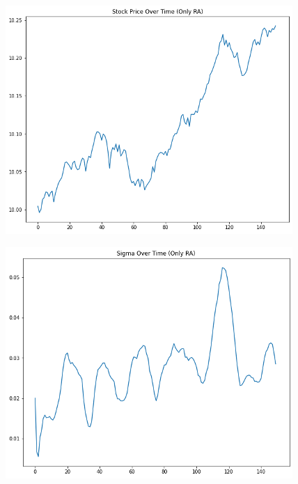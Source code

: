 \documentclass[a4paper, 12pt]{article}
\begin{document}
\begin{figure}[h!]
    \centering
    \begin{minipage}{0.45\textwidth}
        \centering
        \includegraphics[width=\textwidth]{price_s1.png}
        \label{fig:my_label1}
    \end{minipage}
    \hfill
    \begin{minipage}{0.45\textwidth}
        \centering
        \includegraphics[width=\textwidth]{sigma_s1.png}
        \label{fig:my_label2}
    \end{minipage}
\end{figure} 
\end{document}

